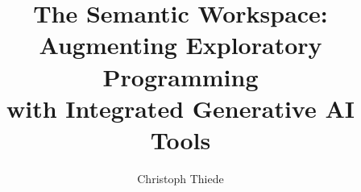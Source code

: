 \documentclass[draft,master,oneside]{swathesis}
\author{Christoph Thiede}
\title{The Semantic Workspace:\\[-4pt] Augmenting Exploratory Programming\\[0pt] with Integrated Generative AI Tools}
\begin{document}
\frontmatter
\maketitle


\cleardoublepage
\tableofcontents
\listoffigures
\listoftables
\mainmatter













\printbibliography[heading=bibintoc]
\clearpage
\appendix

\backmatter
\markboth{}\relax

\makeatletter
\gdef\swa@statementname{Declaration of Authorship}
\gdef\statementcontent{%
	I hereby certify that I have written this thesis independently and have used only the sources and tools indicated or permitted.
}
\end{document}
